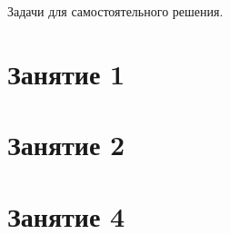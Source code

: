 \documentclass[14pt]{article}
\begin{document}
Задачи для самостоятельного решения.

\section{Занятие 1}



\clearpage

\section{Занятие 2}



\section{Занятие 4}


\end{document}
